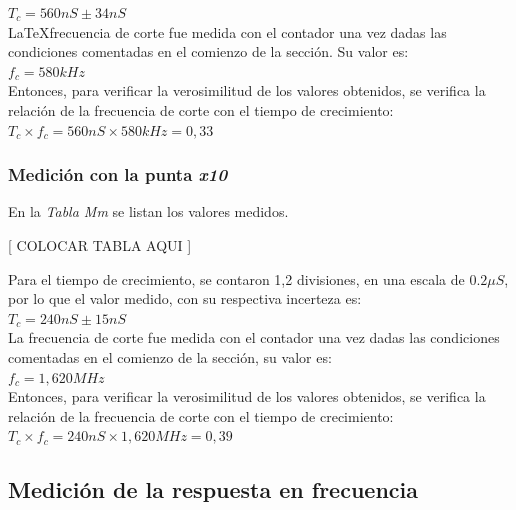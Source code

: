 \documentclass{article}
\begin{document}
$T_c = 560 nS \pm 34 nS$\\

\LaTeX frecuencia de corte fue medida con el contador una vez dadas las condiciones comentadas en el comienzo de la sección. Su valor es: \\

$f_c = 580 kHz$\\

	Entonces, para verificar la verosimilitud de los valores obtenidos, se verifica la relación de la frecuencia de corte con el tiempo de crecimiento:\\

$T_c \times f_c = 560 nS \times 580 kHz = 0,33$\\
\bigskip



\subsubsection{Medición con la punta \textit{x10}} 

En la \textit{Tabla Mm} se listan los valores medidos.
\bigskip\bigskip


	[ COLOCAR TABLA AQUI ]
	\bigskip\bigskip


	Para el tiempo de crecimiento, se contaron 1,2 divisiones, en una escala de $0.2 \mu S$, por lo que el valor medido, con su respectiva incerteza es: \\

$T_c = 240 nS \pm 15 nS$\\

	La frecuencia de corte fue medida con el contador una vez dadas las condiciones comentadas en el comienzo de la sección, su valor es:\\

$f_c = 1,620 MHz$\\

	Entonces, para verificar la verosimilitud de los valores obtenidos, se verifica la relación de la frecuencia de corte con el tiempo de crecimiento:\\

$T_c \times f_c = 240 nS \times 1,620 MHz = 0,39$\\
\bigskip



\subsection{Medición de la respuesta en frecuencia}
	
\end{document}
